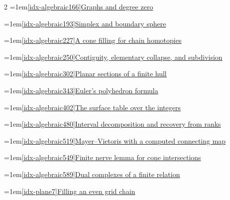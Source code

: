 \begin{multicols}{2}
\noindent\hangindent=1em\hyperref[idx-algebraic166]{\ref*{idx-algebraic166}\enspace Graphs and degree zero}\nobreak\dotfill\,\pageref{idx-algebraic166}\par
\noindent\hangindent=1em\hyperref[idx-algebraic193]{\ref*{idx-algebraic193}\enspace Simplex and boundary sphere}\nobreak\dotfill\,\pageref{idx-algebraic193}\par
\noindent\hangindent=1em\hyperref[idx-algebraic227]{\ref*{idx-algebraic227}\enspace A cone filling for chain homotopies}\nobreak\dotfill\,\pageref{idx-algebraic227}\par
\noindent\hangindent=1em\hyperref[idx-algebraic250]{\ref*{idx-algebraic250}\enspace Contiguity, elementary collapse, and subdivision}\nobreak\dotfill\,\pageref{idx-algebraic250}\par
\noindent\hangindent=1em\hyperref[idx-algebraic302]{\ref*{idx-algebraic302}\enspace Planar sections of a finite hull}\nobreak\dotfill\,\pageref{idx-algebraic302}\par
\noindent\hangindent=1em\hyperref[idx-algebraic343]{\ref*{idx-algebraic343}\enspace Euler's polyhedron formula}\nobreak\dotfill\,\pageref{idx-algebraic343}\par
\noindent\hangindent=1em\hyperref[idx-algebraic402]{\ref*{idx-algebraic402}\enspace The surface table over the integers}\nobreak\dotfill\,\pageref{idx-algebraic402}\par
\noindent\hangindent=1em\hyperref[idx-algebraic480]{\ref*{idx-algebraic480}\enspace Interval decomposition and recovery from ranks}\nobreak\dotfill\,\pageref{idx-algebraic480}\par
\noindent\hangindent=1em\hyperref[idx-algebraic519]{\ref*{idx-algebraic519}\enspace Mayer--Vietoris with a computed connecting map}\nobreak\dotfill\,\pageref{idx-algebraic519}\par
\noindent\hangindent=1em\hyperref[idx-algebraic549]{\ref*{idx-algebraic549}\enspace Finite nerve lemma for cone intersections}\nobreak\dotfill\,\pageref{idx-algebraic549}\par
\noindent\hangindent=1em\hyperref[idx-algebraic589]{\ref*{idx-algebraic589}\enspace Dual complexes of a finite relation}\nobreak\dotfill\,\pageref{idx-algebraic589}\par
\par\addvspace{6pt}\par\nobreak
\noindent\hangindent=1em\hyperref[idx-plane7]{\ref*{idx-plane7}\enspace Filling an even grid chain}\nobreak\dotfill\,\pageref{idx-plane7}\par

\end{multicols}
